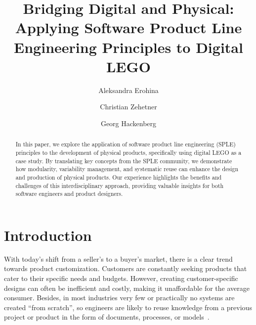 \documentclass[sigconf,review,anonymous]{acmart}
\begin{document}
\title{Bridging Digital and Physical: Applying Software Product Line Engineering Principles to Digital LEGO}

\author{Aleksandra Erohina}

\author{Christian Zehetner}

\author{Georg Hackenberg}

\begin{abstract}
    In this paper, we explore the application of software product line engineering (SPLE) principles to the development of physical products, specifically using digital LEGO as a case study. 
    By translating key concepts from the SPLE community, we demonstrate how modularity, variability management, and systematic reuse can enhance the design and production of physical products. 
    Our experience highlights the benefits and challenges of this interdisciplinary approach, providing valuable insights for both software engineers and product designers.
\end{abstract}


\maketitle

\section{Introduction}
\label{sec:introduction}

With today's shift from a seller's to a buyer's market, there is a clear trend towards product customization. 
Customers are constantly seeking products that cater to their specific needs and budgets. 
However, creating customer-specific designs can often be inefficient and costly, making it unaffordable for the average consumer.
Besides, in most industries very few or practically no systems are created “from scratch”, so engineers are likely to reuse knowledge from a previous project or product in the form of documents, processes, or models~\cite{Góngora_2015}. 
\end{document}

